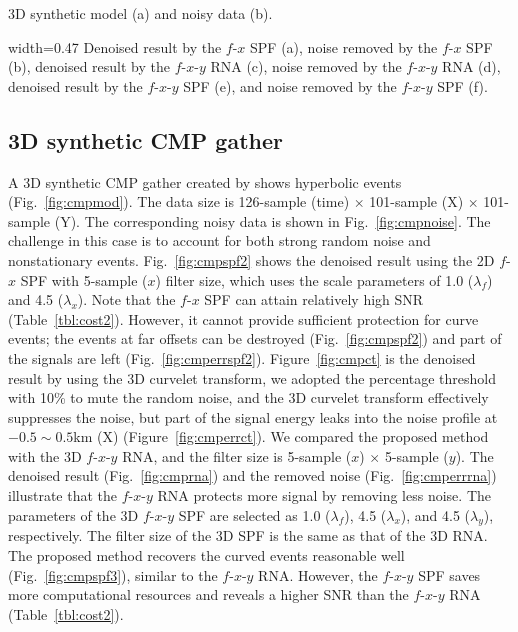  {3D synthetic
  model (a) and noisy data (b).}

{width=0.47\columnwidth} {Denoised result by the $f$-$x$ SPF (a),
  noise removed by the $f$-$x$ SPF (b), denoised result by the
  $f$-$x$-$y$ RNA (c), noise removed by the $f$-$x$-$y$ RNA (d),
  denoised result by the $f$-$x$-$y$ SPF (e), and noise removed by the
  $f$-$x$-$y$ SPF (f).}

\subsection{3D synthetic CMP gather}

A 3D synthetic CMP gather created by \cite{Liug13} shows hyperbolic
events (Fig.~\ref{fig:cmpmod}). The data size is 126-sample (time)
$\times$ 101-sample (X) $\times$ 101-sample (Y). The corresponding
noisy data is shown in Fig.~\ref{fig:cmpnoise}.  The challenge in this
case is to account for both strong random noise and nonstationary
events. Fig.~\ref{fig:cmpspf2} shows the denoised result using the 2D
$f$-$x$ SPF with 5-sample ($x$) filter size, which uses the scale
parameters of 1.0 ($\lambda_{f}$) and 4.5 ($\lambda_{x}$).  Note that
the $f$-$x$ SPF can attain relatively high SNR
(Table~\ref{tbl:cost2}).  However, it cannot provide sufficient
protection for curve events; the events at far offsets can be
destroyed (Fig.~\ref{fig:cmpspf2}) and part of the signals are left
(Fig.~\ref{fig:cmperrspf2}).  Figure~\ref{fig:cmpct} is the denoised
result by using the 3D curvelet transform, we adopted the percentage
threshold with 10\% to mute the random noise, and the 3D curvelet
transform effectively suppresses the noise, but part of the signal
energy leaks into the noise profile at $-0.5 \sim 0.5$km (X)
(Figure~\ref{fig:cmperrct}).  We compared the proposed method with the
3D $f$-$x$-$y$ RNA, and the filter size is 5-sample ($x$) $\times$
5-sample ($y$). The denoised result (Fig.~\ref{fig:cmprna}) and the
removed noise (Fig.~\ref{fig:cmperrrna}) illustrate that the
$f$-$x$-$y$ RNA protects more signal by removing less noise.  The
parameters of the 3D $f$-$x$-$y$ SPF are selected as 1.0
($\lambda_{f}$), 4.5 ($\lambda_{x}$), and 4.5 ($\lambda_{y}$),
respectively. The filter size of the 3D SPF is the same as that of the
3D RNA. The proposed method recovers the curved events reasonable well
(Fig.~\ref{fig:cmpspf3}), similar to the $f$-$x$-$y$ RNA.  However,
the $f$-$x$-$y$ SPF saves more computational resources and reveals a
higher SNR than the $f$-$x$-$y$ RNA (Table~\ref{tbl:cost2}).

